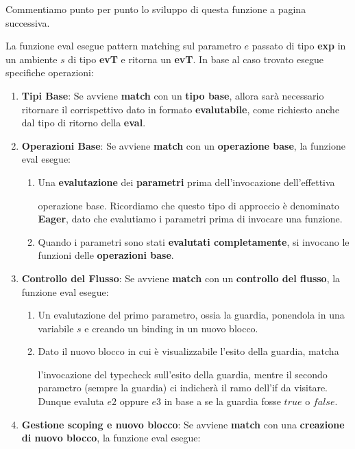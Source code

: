 \documentclass{article}
\begin{document}
Commentiamo punto per punto lo sviluppo di questa funzione a pagina successiva.

\newpage

La funzione eval esegue pattern matching sul parametro $e$ passato di tipo \textbf{exp} in un ambiente $s$ di tipo \textbf{evT} e ritorna un \textbf{evT}. In base al caso trovato esegue specifiche operazioni:

\begin{enumerate}
    \item \textbf{Tipi Base}: Se avviene \textbf{match} con un \textbf{tipo base}, allora sarà necessario ritornare il corrispettivo dato in formato \textbf{evalutabile}, come richiesto anche dal tipo di ritorno della \textbf{eval}.
    \item \textbf{Operazioni Base}: Se avviene \textbf{match} con un \textbf{operazione base}, la funzione eval esegue:
    \begin{enumerate}
        \item Una \textbf{evalutazione} dei \textbf{parametri} prima dell'invocazione dell'effettiva 
        
        operazione base. Ricordiamo che questo tipo di approccio è denominato \textbf{Eager}, dato che evalutiamo i parametri prima di invocare una funzione.
        \item Quando i parametri sono stati \textbf{evalutati completamente}, si invocano le funzioni delle \textbf{operazioni base}.
    \end{enumerate}

    \item \textbf{Controllo del Flusso}: Se avviene \textbf{match} con un \textbf{controllo del flusso}, la funzione eval esegue:
    \begin{enumerate}
        \item Un evalutazione del primo parametro, ossia la guardia, ponendola in una variabile $s$ e creando un binding in un nuovo blocco.
        \item Dato il nuovo blocco in cui è visualizzabile l'esito della guardia, matcha 
        
        l'invocazione del typecheck sull'esito della guardia, mentre il secondo parametro (sempre la guardia) ci indicherà il ramo dell'if da visitare. Dunque evaluta $e2$ oppure $e3$ in base a se la guardia fosse $true$ o $false$.
    \end{enumerate}

    \item \textbf{Gestione scoping e nuovo blocco}: Se avviene \textbf{match} con una \textbf{creazione di nuovo blocco}, la funzione eval esegue:


\end{enumerate}
\end{document}
